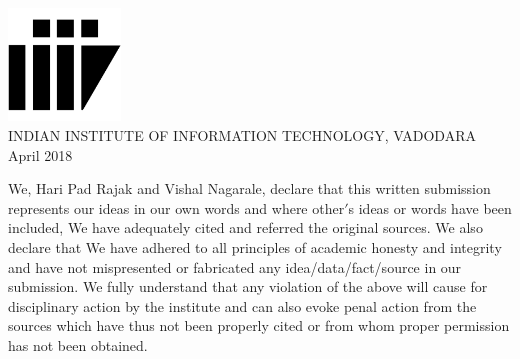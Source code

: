 \documentclass[12pt, oneside]{report}
\numberwithin{equation}{section}
\begin{document}
\begin{center}
\vspace*{2cm}
\includegraphics[width=3cm]{logo}\\
\vspace{0.1in}
{\large INDIAN INSTITUTE OF INFORMATION TECHNOLOGY, VADODARA \\
 April 2018}
\end{center}
\newpage



\thispagestyle{empty}

\newpage
%
\justify
We, Hari Pad Rajak and Vishal Nagarale, declare that this written submission represents our ideas in our own words and where
other$'$s ideas or words have been included, We have adequately cited and referred the
original sources. We also declare that We have adhered to all principles of academic honesty
and integrity and have not mispresented or fabricated any idea/data/fact/source
in our submission. We fully understand that any violation of the above will cause for disciplinary
action by the institute and can also evoke penal action from the sources which have thus
not been properly cited or from whom proper permission has not been obtained.\\
\vspace{1cm}
\end{document}

